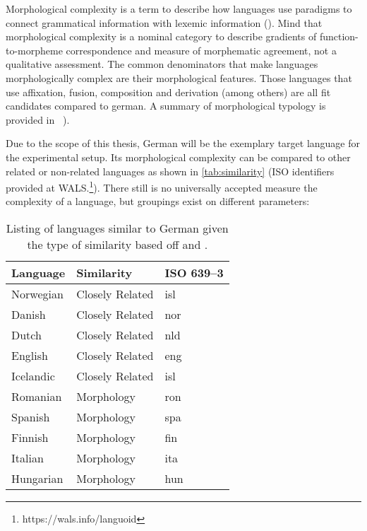 Morphological complexity is a term to describe how languages use paradigms to connect grammatical information with lexemic information (\cite{MORPHOLOGICALCOMPLEXITY}).
Mind that morphological complexity is a nominal category to describe gradients of function-to-morpheme correspondence and measure of morphematic agreement, not a qualitative assessment.
The common denominators that make languages morphologically complex are their morphological features.
Those languages that use affixation, fusion, composition and derivation (among others) are all fit candidates compared to german.
A summary of morphological typology is provided in ~\cite*[78--93]{LINGUISTICTYPOLOGY}).

Due to the scope of this thesis, German will be the exemplary target language for the experimental setup.
Its morphological complexity can be compared to other related or non-related languages as shown in \autoref{tab:similarity} (ISO identifiers provided at WALS.\footnote{https://wals.info/languoid}).
There still is no universally accepted measure the complexity of a language, but groupings exist on different parameters:
\\
\begin{table}[h]
    \centering
    \caption[List of similar languages]{Listing of languages similar to German given the type of similarity based off \textcite{lehmann} and \textcite{MORPHOSYNTAXCOMPLEXITY1}.}
    \label{tab:similarity}
    \begin{tabular}{lll}
        \toprule
        \textbf{Language} & \textbf{Similarity} & \textbf{ISO 639--3} \\
        \midrule
        Norwegian & Closely Related & isl \\
        Danish & Closely Related & nor \\
        Dutch & Closely Related & nld \\
        English & Closely Related & eng \\
        Icelandic & Closely Related & isl \\
        Romanian & Morphology & ron \\
        Spanish & Morphology & spa \\
        Finnish & Morphology & fin \\
        Italian & Morphology & ita \\
        Hungarian & Morphology & hun \\
        \bottomrule
    \end{tabular}

\end{table}

